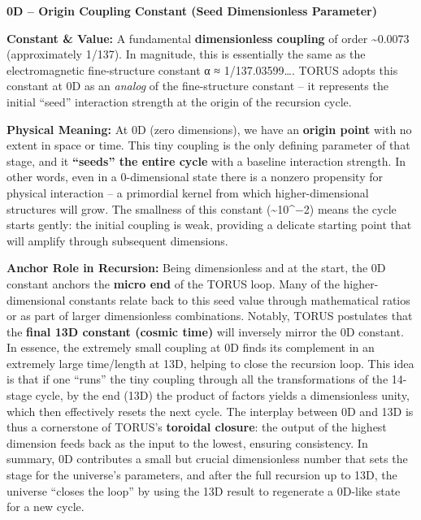 \documentclass[
]{article}
\begin{document}
\textbf{0D -- Origin Coupling Constant (Seed Dimensionless Parameter)}

\textbf{Constant \& Value:} A fundamental \textbf{dimensionless
coupling} of order \textasciitilde0.0073 (approximately
1/137)\hspace{0pt}. In magnitude, this is essentially the same as the
electromagnetic fine-structure constant α ≈
1/137.03599\ldots\hspace{0pt}. TORUS adopts this constant at 0D as an
\emph{analog} of the fine-structure constant -- it represents the
initial ``seed'' interaction strength at the origin of the recursion
cycle.

\textbf{Physical Meaning:} At 0D (zero dimensions), we have an
\textbf{origin point} with no extent in space or time. This tiny
coupling is the only defining parameter of that stage, and it
\textbf{``seeds'' the entire cycle} with a baseline interaction
strength\hspace{0pt}. In other words, even in a 0-dimensional state
there is a nonzero propensity for physical interaction -- a primordial
kernel from which higher-dimensional structures will grow. The smallness
of this constant (\textasciitilde10\^{}−2) means the cycle starts
gently: the initial coupling is weak, providing a delicate starting
point that will amplify through subsequent dimensions\hspace{0pt}.

\textbf{Anchor Role in Recursion:} Being dimensionless and at the start,
the 0D constant anchors the \textbf{micro end} of the TORUS loop. Many
of the higher-dimensional constants relate back to this seed value
through mathematical ratios or as part of larger dimensionless
combinations. Notably, TORUS postulates that the \textbf{final 13D
constant (cosmic time)} will inversely mirror the 0D
constant\hspace{0pt}. In essence, the extremely small coupling at 0D
finds its complement in an extremely large time/length at 13D, helping
to close the recursion loop. This idea is that if one ``runs'' the tiny
coupling through all the transformations of the 14-stage cycle, by the
end (13D) the product of factors yields a dimensionless unity, which
then effectively resets the next cycle\hspace{0pt}. The interplay
between 0D and 13D is thus a cornerstone of TORUS's \textbf{toroidal
closure}: the output of the highest dimension feeds back as the input to
the lowest, ensuring consistency. In summary, 0D contributes a small but
crucial dimensionless number that sets the stage for the universe's
parameters, and after the full recursion up to 13D, the universe
``closes the loop'' by using the 13D result to regenerate a 0D-like
state for a new cycle\hspace{0pt}.
\end{document}
